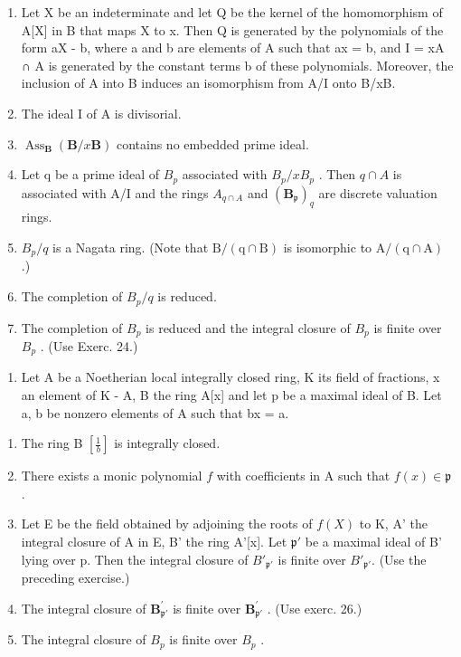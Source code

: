 \begin{enumerate}
\def\labelenumi{\alph{enumi})}
\item
  Let X be an indeterminate and let Q be the kernel of the homomorphism of A{[}X{]} in B that maps X to x. Then Q is generated by the polynomials of the form aX - b, where a and b are elements of A such that ax = b, and I = xA ∩ A is generated by the constant terms b of these polynomials. Moreover, the inclusion of A into B induces an isomorphism from A/I onto B/xB.
\item
  The ideal I of A is divisorial.
\item
  \(\operatorname{Ass}_{\mathbf{B}}(\mathbf{B}/x\mathbf{B})\) contains no embedded prime ideal.
\item
  Let q be a prime ideal of \(B_{p}\) associated with \(B_{p}/xB_{p}\) . Then \(q \cap A\) is associated with A/I and the rings \(A_{q \cap A}\) and \((\mathbf{B}_{\mathfrak{p}})_{q}\) are discrete valuation rings.
\item
  \(B_{p}/q\) is a Nagata ring. (Note that \(\mathrm{B}/(\mathrm{q} \cap \mathrm{B})\) is isomorphic to \(\mathrm{A}/(\mathrm{q} \cap \mathrm{A})\) .)
\item
  The completion of \(B_{p}/q\) is reduced.
\item
  The completion of \(B_{p}\) is reduced and the integral closure of \(B_{p}\) is finite over \(B_{p}\) . (Use Exerc. 24.)
\end{enumerate}

\begin{enumerate}
\def\labelenumi{\arabic{enumi})}
\setcounter{enumi}{27}
\tightlist
\item
  Let A be a Noetherian local integrally closed ring, K its field of fractions, x an element of K - A, B the ring A{[}x{]} and let p be a maximal ideal of B. Let a, b be nonzero elements of A such that bx = a.
\end{enumerate}

\begin{enumerate}
\def\labelenumi{\alph{enumi})}
\item
  The ring B \(\left[\frac{1}{b}\right]\) is integrally closed.
\item
  There exists a monic polynomial \(f\) with coefficients in A such that \(f(x)\in\mathfrak{p}\) .
\item
  Let E be the field obtained by adjoining the roots of \(f(X)\) to K, A' the integral closure of A in E, B' the ring A'{[}x{]}. Let \(\mathfrak{p}'\) be a maximal ideal of B' lying over p. Then the integral closure of \(B'_{\mathfrak{p}'}\) is finite over \(B'_{\mathfrak{p}'}\). (Use the preceding exercise.)
\item
  The integral closure of \(\mathbf{B}_{\mathfrak{p}'}^{\prime}\) is finite over \(\mathbf{B}_{\mathfrak{p}'}^{\prime}\) . (Use exerc. 26.)
\item
  The integral closure of \(B_{p}\) is finite over \(B_{p}\) .
\end{enumerate}

